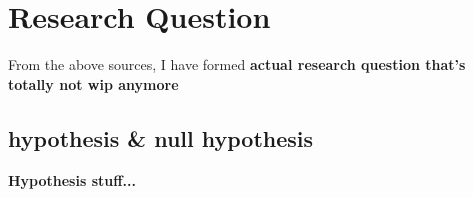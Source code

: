 \section{Research Question}

From the above sources, I have formed \textbf{actual research question that's totally not wip anymore}

\subsection{hypothesis \& null hypothesis}

\textbf{Hypothesis stuff...}